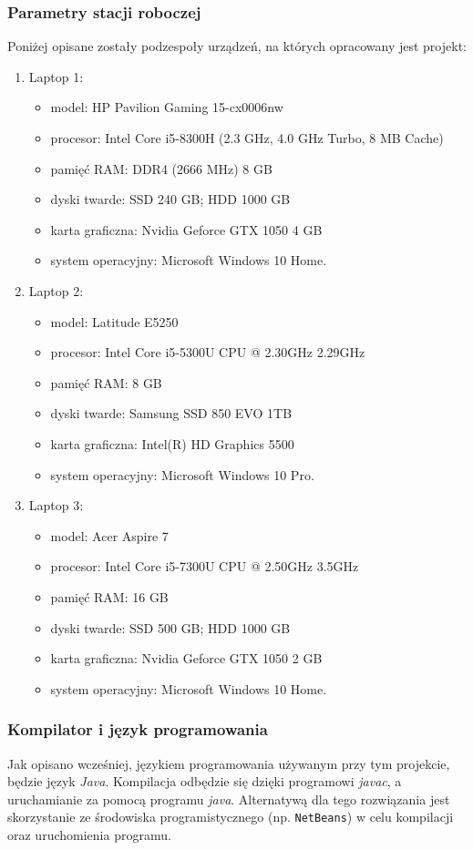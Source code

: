\documentclass[12pt,a4paper]{article}
\begin{document}
\subsubsection{Parametry stacji roboczej} 
Poniżej opisane zostały podzespoły urządzeń, na których opracowany jest projekt:
\begin{enumerate}
\item Laptop 1:
\begin{itemize}
\item model: HP Pavilion Gaming 15-cx0006nw
\item procesor: Intel Core i5-8300H (2.3 GHz, 4.0 GHz Turbo, 8 MB Cache)
\item pamięć RAM: DDR4 (2666 MHz) 8 GB
\item dyski twarde: SSD 240 GB; HDD 1000 GB
\item karta graficzna: Nvidia Geforce GTX 1050 4 GB
\item system operacyjny: Microsoft Windows 10 Home.
\end{itemize}
\item Laptop 2:
\begin{itemize}
\item model: Latitude E5250
\item procesor: Intel Core i5-5300U CPU @ 2.30GHz  2.29GHz
\item pamięć RAM: 8 GB
\item dyski twarde: Samsung SSD 850 EVO 1TB 
\item karta graficzna: Intel(R) HD Graphics 5500
\item system operacyjny: Microsoft Windows 10 Pro.
\end{itemize}
\item Laptop 3:
\begin{itemize}
\item model: Acer Aspire 7 
\item procesor: Intel Core i5-7300U CPU @ 2.50GHz  3.5GHz
\item pamięć RAM: 16 GB
\item dyski twarde: SSD 500 GB; HDD 1000 GB
\item karta graficzna: Nvidia Geforce GTX 1050 2 GB
\item system operacyjny: Microsoft Windows 10 Home.
\end{itemize}
\end{enumerate}

\subsubsection{Kompilator i język programowania} 
Jak opisano wcześniej, językiem programowania używanym przy tym projekcie, będzie język \textit{Java}. Kompilacja odbędzie się dzięki programowi \textit{javac}, a uruchamianie za pomocą programu \textit{java}. Alternatywą dla tego rozwiązania jest skorzystanie ze środowiska programistycznego (np. \texttt{NetBeans}) w celu kompilacji oraz uruchomienia programu.
\end{document}
